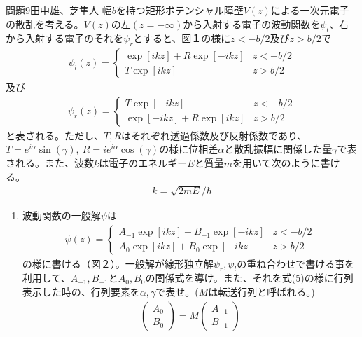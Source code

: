 \documentclass[fleqn]{jbook}
\begin{document}
\begin{question}{問題9}{田中雄、芝隼人}
幅$b$を持つ矩形ポテンシャル障壁$V(z)$による一次元電子の散乱を考える。$V(z)$の左$(z=-\infty )$から入射する電子の波動関数を$\psi_l$、右から入射する電子のそれを$\psi_r$とすると、図１の様に$z<-b/2$及び$z>b/2$で
\begin{eqnarray}
\psi_l (z)=\left\{ 
\begin{array}{ll}{}
\exp [ikz]+R\exp [-ikz] & z<-b/2 \\
T \exp [ikz] & z>b/2 
\end{array}
\right.
\end{eqnarray}
及び
\begin{eqnarray}
\psi_r (z) = \left\{ 
\begin{array}{ll}{}
T\exp [-ikz] & z< -b/2 \\
\exp [-ikz] +R \exp [ikz] & z> b/2 
\end{array}
\right.
\end{eqnarray}
と表される。ただし、$T,R$はそれぞれ透過係数及び反射係数であり、$T= e^{i\alpha}\sin (\gamma ),\ R= ie^{i\alpha}\cos (\gamma )$の様に位相差$\alpha$と散乱振幅に関係した量$\gamma$で表される。また、波数$k$は電子のエネルギー$E$と質量$m$を用いて次のように書ける。
\begin{eqnarray}
k=\sqrt{2mE}/\hbar
\end{eqnarray}
\begin{enumerate}
\item
波動関数の一般解$\psi$は
\begin{eqnarray}
\psi (z) =\left\{
\begin{array}{ll}{}
A_{-1}\exp [ikz] +B_{-1}\exp [-ikz] & z< -b/2 \\
A_0 \exp [ikz] + B_0 \exp [-ikz] & z> b/2 
\end{array}
\right. \end{eqnarray}
の様に書ける（図２）。一般解が線形独立解$\psi_r , \psi_l$の重ね合わせで書ける事を利用して、$A_{-1},B_{-1}$と$A_0, B_0$の関係式を導け。また、それを式(5)の様に行列表示した時の、行列要素を$\alpha , \gamma$で表せ。($M$は転送行列と呼ばれる。)
\begin{eqnarray}
\left( \begin{array}{c}{}
A_0 \\ B_0 
\end{array}\right) =M \left(
\begin{array}{c}{}
A_{-1} \\ B_{-1} 
\end{array}\right) 
\end{eqnarray}
\end{enumerate}


\end{question}
\end{document}
